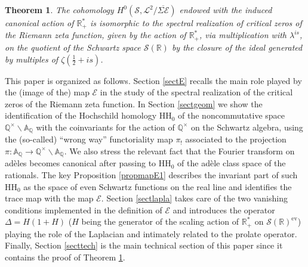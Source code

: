 \documentclass{pspum-l}
\newtheorem{theorem}{Theorem}[section]
\theoremstyle{definition}
\theoremstyle{remark}
\numberwithin{equation}{section}
\def\A{{\mathbb A}}
\def\Q{{\mathbb Q}}
\def\R{{\mathbb R}}
\def\cE{{\mathcal E}}
\def\cL{{\mathcal L}}
\def\cS{{\mathcal S}}
\def\scal2{{\mathscr S}}
\def\HH{\text{HH}}
\begin{document}
  \begin{theorem}\label{spectralreal1intro} The  cohomology $H^0(\scal2,\cL^2/\overline{\Sigma\cE})$ endowed with the induced canonical action of $\R_+^*$ is isomorphic to the  spectral realization of  critical zeros of the Riemann zeta function, given by the action of $\R_+^*$,  via multiplication with $\lambda^{is}$, on the quotient of the Schwartz space $\cS(\R)$ by the closure of the ideal generated by multiples of $\zeta\left(\frac 12 +is\right)$. 	
 \end{theorem}

 
 
This paper is organized as follows. Section \ref{sectE} recalls  the main role played by the (image of the) map $\cE$
in the study of the spectral realization of the critical zeros of the Riemann zeta function.
In Section \ref{sectgeom} we show the identification of the Hochschild homology HH$_0$ of the 
noncommutative space $\Q^\times\backslash \A_\Q$ with the coinvariants for the action of $\Q^\times$ on the Schwartz algebra, using the (so-called) ``wrong way'' functoriality map $\pi_!$
associated to the projection $\pi:\A_\Q\to \Q^\times\backslash \A_\Q$. We also stress the relevant fact that the Fourier transform on ad\`eles becomes canonical after passing to $\HH_0$ of the ad\`ele class space of the rationals. The key Proposition \ref{propmapE1} describes the invariant part of  such $\HH_0$ as the space of even Schwartz functions on the real line and identifies the trace map with the map $\cE$. 
Section \ref{sectlapla} takes care of the two vanishing conditions implemented in the definition of  $\cE$ and introduces the  operator $\Delta=H(1+H)$ ($H$ being the generator of the scaling action of $\R^*_+$ on $\cS(\R)^{\text{ev}}$) playing the role of the Laplacian and intimately related to the prolate operator. %
Finally, Section \ref{secttech} is the main technical section of this paper since it contains the proof of Theorem \ref{spectralreal1intro}. 
\end{document}
